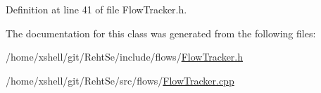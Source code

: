 Definition at line 41 of file Flow\+Tracker.\+h.



The documentation for this class was generated from the following files\+:\begin{DoxyCompactItemize}
\item 
/home/xshell/git/\+Reht\+Se/include/flows/\hyperlink{_flow_tracker_8h}{Flow\+Tracker.\+h}\item 
/home/xshell/git/\+Reht\+Se/src/flows/\hyperlink{_flow_tracker_8cpp}{Flow\+Tracker.\+cpp}\end{DoxyCompactItemize}
